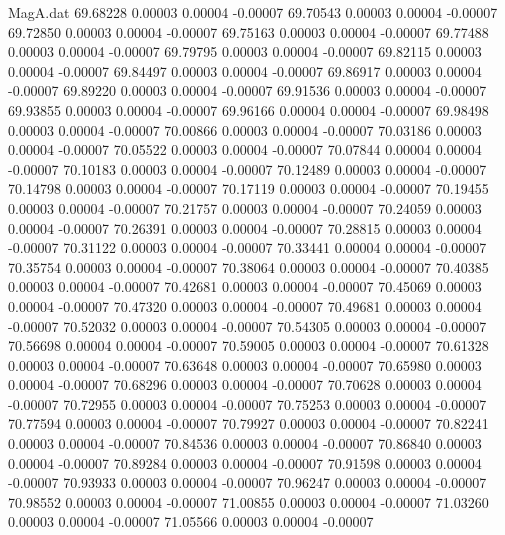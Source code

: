 \begin{filecontents}{MagA.dat}
  69.68228    0.00003    0.00004   -0.00007
  69.70543    0.00003    0.00004   -0.00007
  69.72850    0.00003    0.00004   -0.00007
  69.75163    0.00003    0.00004   -0.00007
  69.77488    0.00003    0.00004   -0.00007
  69.79795    0.00003    0.00004   -0.00007
  69.82115    0.00003    0.00004   -0.00007
  69.84497    0.00003    0.00004   -0.00007
  69.86917    0.00003    0.00004   -0.00007
  69.89220    0.00003    0.00004   -0.00007
  69.91536    0.00003    0.00004   -0.00007
  69.93855    0.00003    0.00004   -0.00007
  69.96166    0.00004    0.00004   -0.00007
  69.98498    0.00003    0.00004   -0.00007
  70.00866    0.00003    0.00004   -0.00007
  70.03186    0.00003    0.00004   -0.00007
  70.05522    0.00003    0.00004   -0.00007
  70.07844    0.00004    0.00004   -0.00007
  70.10183    0.00003    0.00004   -0.00007
  70.12489    0.00003    0.00004   -0.00007
  70.14798    0.00003    0.00004   -0.00007
  70.17119    0.00003    0.00004   -0.00007
  70.19455    0.00003    0.00004   -0.00007
  70.21757    0.00003    0.00004   -0.00007
  70.24059    0.00003    0.00004   -0.00007
  70.26391    0.00003    0.00004   -0.00007
  70.28815    0.00003    0.00004   -0.00007
  70.31122    0.00003    0.00004   -0.00007
  70.33441    0.00004    0.00004   -0.00007
  70.35754    0.00003    0.00004   -0.00007
  70.38064    0.00003    0.00004   -0.00007
  70.40385    0.00003    0.00004   -0.00007
  70.42681    0.00003    0.00004   -0.00007
  70.45069    0.00003    0.00004   -0.00007
  70.47320    0.00003    0.00004   -0.00007
  70.49681    0.00003    0.00004   -0.00007
  70.52032    0.00003    0.00004   -0.00007
  70.54305    0.00003    0.00004   -0.00007
  70.56698    0.00004    0.00004   -0.00007
  70.59005    0.00003    0.00004   -0.00007
  70.61328    0.00003    0.00004   -0.00007
  70.63648    0.00003    0.00004   -0.00007
  70.65980    0.00003    0.00004   -0.00007
  70.68296    0.00003    0.00004   -0.00007
  70.70628    0.00003    0.00004   -0.00007
  70.72955    0.00003    0.00004   -0.00007
  70.75253    0.00003    0.00004   -0.00007
  70.77594    0.00003    0.00004   -0.00007
  70.79927    0.00003    0.00004   -0.00007
  70.82241    0.00003    0.00004   -0.00007
  70.84536    0.00003    0.00004   -0.00007
  70.86840    0.00003    0.00004   -0.00007
  70.89284    0.00003    0.00004   -0.00007
  70.91598    0.00003    0.00004   -0.00007
  70.93933    0.00003    0.00004   -0.00007
  70.96247    0.00003    0.00004   -0.00007
  70.98552    0.00003    0.00004   -0.00007
  71.00855    0.00003    0.00004   -0.00007
  71.03260    0.00003    0.00004   -0.00007
  71.05566    0.00003    0.00004   -0.00007

\end{filecontents}
